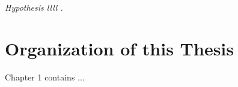 \textit{Hypothesis llll . }

\section{Organization of this Thesis}

Chapter 1 contains ...





%
%
%
%
%
%
